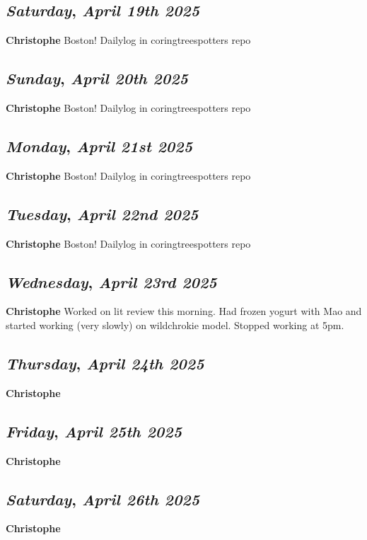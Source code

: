 \def\day{\textit{April 19th 2025}}
\def\weekday{\textit{Saturday}}
\subsection*{\weekday, \day}
\textbf {Christophe}
Boston! Dailylog in coringtreespotters repo

\def\day{\textit{April 20th 2025}}
\def\weekday{\textit{Sunday}}
\subsection*{\weekday, \day}
\textbf {Christophe}
Boston! Dailylog in coringtreespotters repo
\def\day{\textit{April 21st 2025}}
\def\weekday{\textit{Monday}}
\subsection*{\weekday, \day}
\textbf {Christophe}
Boston! Dailylog in coringtreespotters repo
\def\day{\textit{April 22nd 2025}}
\def\weekday{\textit{Tuesday}}
\subsection*{\weekday, \day}
\textbf {Christophe}
Boston! Dailylog in coringtreespotters repo
\def\day{\textit{April 23rd 2025}}
\def\weekday{\textit{Wednesday}}
\subsection*{\weekday, \day}
\textbf {Christophe}
Worked on lit review this morning. Had frozen yogurt with Mao and started working (very slowly) on wildchrokie model. Stopped working at 5pm.

\def\day{\textit{April 24th 2025}}
\def\weekday{\textit{Thursday}}
\subsection*{\weekday, \day}
\textbf {Christophe}

\def\day{\textit{April 25th 2025}}
\def\weekday{\textit{Friday}}
\subsection*{\weekday, \day}
\textbf {Christophe}

\def\day{\textit{April 26th 2025}}
\def\weekday{\textit{Saturday}}
\subsection*{\weekday, \day}
\textbf {Christophe}

